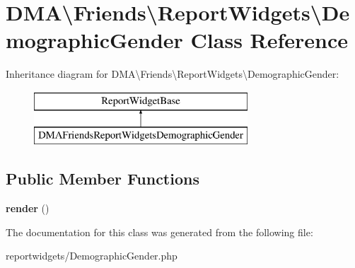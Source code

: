 \hypertarget{classDMA_1_1Friends_1_1ReportWidgets_1_1DemographicGender}{}\section{D\+M\+A\textbackslash{}Friends\textbackslash{}Report\+Widgets\textbackslash{}Demographic\+Gender Class Reference}
\label{classDMA_1_1Friends_1_1ReportWidgets_1_1DemographicGender}
Inheritance diagram for D\+M\+A\textbackslash{}Friends\textbackslash{}Report\+Widgets\textbackslash{}Demographic\+Gender\+:\begin{figure}[H]
\begin{center}
\leavevmode
\includegraphics[height=2.000000cm]{d8/d3d/classDMA_1_1Friends_1_1ReportWidgets_1_1DemographicGender}
\end{center}
\end{figure}
\subsection*{Public Member Functions}
\begin{DoxyCompactItemize}
\item 
\hypertarget{classDMA_1_1Friends_1_1ReportWidgets_1_1DemographicGender_aebec7f7c6edd6900ec3f597ead9b8193}{}{\bfseries render} ()\label{classDMA_1_1Friends_1_1ReportWidgets_1_1DemographicGender_aebec7f7c6edd6900ec3f597ead9b8193}

\end{DoxyCompactItemize}


The documentation for this class was generated from the following file\+:\begin{DoxyCompactItemize}
\item 
reportwidgets/Demographic\+Gender.\+php\end{DoxyCompactItemize}
